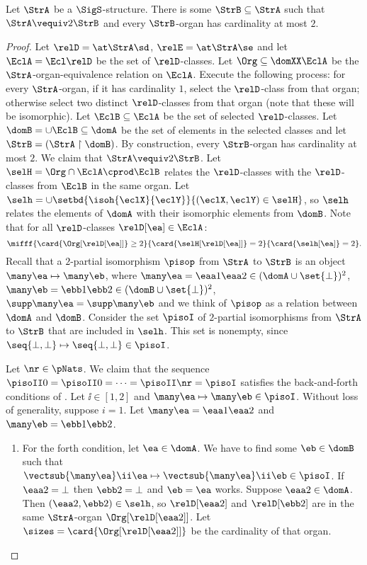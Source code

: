 \begin{lemma}\label{lem:twovar-organ-2}
Let $\StrA$ be a $\SigS$-structure. There is some $\StrB \subseteq \StrA$ such
that $\StrA \vequiv2 \StrB$ and every $\StrB$-organ has cardinality at most
$2$.
\end{lemma}
\begin{proof}
Let $\relD = \at\StrA\sd$, $\relE = \at\StrA\se$ and 
let $\EclA = \Ecl\relD$ be the set of $\relD$-classes.
Let $\Org \subseteq \domXX\EclA$ be the
$\StrA$-organ-equivalence relation on $\EclA$.
Execute the following process: for every $\StrA$-organ, if it has cardinality
$1$, select the $\relD$-class from that organ; otherwise select two distinct
$\relD$-classes from that organ (note that these will be isomorphic).
Let $\EclB \subseteq \EclA$ be the set of selected $\relD$-classes.
Let $\domB = \cup \EclB \subseteq \domA$ be the set of elements in the
selected classes and let $\StrB = (\StrA \restriction \domB)$.
By construction, every $\StrB$-organ has cardinality at most $2$.
We claim that $\StrA \vequiv2 \StrB$.
Let $\selH = \Org \cap \EclA\cprod\EclB$ relates the $\relD$-classes with the
$\relD$-classes from $\EclB$ in the same organ.
Let $\selh = \cup \setbd{\isoh{\eclX}{\eclY}}{(\eclX,\eclY) \in \selH}$, so
$\selh$ relates the elements of $\domA$ with their isomorphic elements from
$\domB$.
Note that for all $\relD$-classes $\relD[\ea] \in \EclA$:
\begin{equation}\label{eq:twovar-organ-2}
  \mifff{
  \card{\Org[\relD[\ea]]} \geq 2}{
  \card{\selH[\relD[\ea]]} = 2}{
  \card{\selh[\ea]} = 2}.
\end{equation}
Recall that a $2$-partial isomorphism $\pisop$ from $\StrA$ to $\StrB$ is an
object $\many\ea \mapsto \many\eb$, where
$\many\ea = \eaa1\eaa2 \in (\domA \cup \set{\bot})^2$,
$\many\eb  = \ebb1\ebb2 \in (\domB \cup \set{\bot})^2$,
$\supp\many\ea = \supp\many\eb$
and we think of $\pisop$ as a relation between $\domA$ and $\domB$.
Consider the set $\pisoI$ of $2$-partial isomorphisms from
$\StrA$ to $\StrB$ that are included in $\selh$.
This set is nonempty, since $\seq{\bot,\bot}\mapsto\seq{\bot,\bot} \in \pisoI$.

Let $\nr \in \pNats$.
We claim that the sequence $\pisoII0 = \pisoII0 = \dots = \pisoII\nr = \pisoI$
satisfies the back-and-forth conditions of .
Let $\ii \in [1,2]$ and $\many\ea \mapsto \many\eb \in \pisoI$.
Without loss of generality, suppose $i = 1$.
Let $\many\ea = \eaa1\eaa2$ and $\many\eb = \ebb1\ebb2$.
\begin{enumerate}
  \item For the forth condition, let $\ea \in \domA$.
  We have to find some $\eb \in \domB$ such that
  $\vectsub{\many\ea}\ii\ea \mapsto \vectsub{\many\ea}\ii\eb \in \pisoI$.
  If $\eaa2 = \bot$ then $\ebb2 = \bot$ and $\eb = \ea$ works.
  Suppose $\eaa2 \in \domA$. Then $(\eaa2,\ebb2) \in \selh$, so
  $\relD[\eaa2]$ and $\relD[\ebb2]$ are in the same $\StrA$-organ
  $\Org[\relD[\eaa2]]$.
  Let $\sizes = \card{\Org[\relD[\eaa2]]}$ be the cardinality of that organ.
 

\end{enumerate}
\end{proof}
